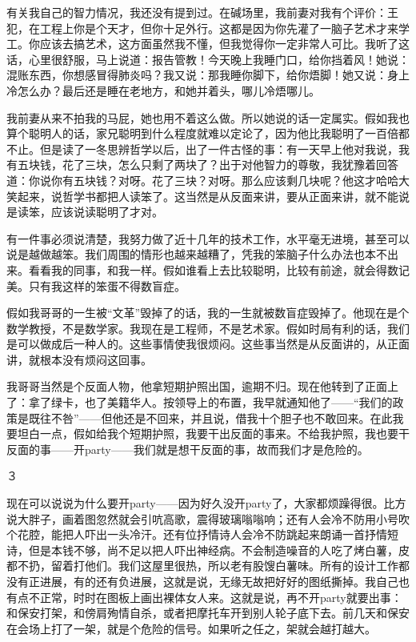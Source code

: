 有关我自己的智力情况，我还没有提到过。在碱场里，我前妻对我有个评价：王犯，在工程上你是个天才，但你十足外行。这都是因为你先灌了一脑子艺术才来学工。你应该去搞艺术，这方面虽然我不懂，但我觉得你一定非常人可比。我听了这话，心里很舒服，马上说道：报告管教！今天晚上我睡门口，给你挡着风！她说：混账东西，你想感冒得肺炎吗？我又说：那我睡你脚下，给你焐脚！她又说：身上冷怎么办？最后还是睡在老地方，和她并着头，哪儿冷焐哪儿。 

我前妻从来不拍我的马屁，她也用不着这么做。所以她说的话一定属实。假如我也算个聪明人的话，家兄聪明到什么程度就难以定论了，因为他比我聪明了一百倍都不止。但是读了一冬思辨哲学以后，出了一件古怪的事：有一天早上他对我说，我有五块钱，花了三块，怎么只剩了两块了？出于对他智力的尊敬，我犹豫着回答道：你说你有五块钱？对呀。花了三块？对呀。那么应该剩几块呢？他这才哈哈大笑起来，说哲学书都把人读笨了。这当然是从反面来讲，要从正面来讲，就不能说是读笨，应该说读聪明了才对。 



有一件事必须说清楚，我努力做了近十几年的技术工作，水平毫无进境，甚至可以说是越做越笨。我们周围的情形也越来越糟了，凭我的笨脑子什么办法也本不出来。看看我的同事，和我一样。假如谁看上去比较聪明，比较有前途，就会得数记美。只有我这样的笨蛋不得数盲症。 

假如我哥哥的一生被“文革”毁掉了的话，我的一生就被数盲症毁掉了。他现在是个数学教授，不是数学家。我现在是工程师，不是艺术家。假如时局有利的话，我们是可以做成后一种人的。这些事情使我很烦闷。这些事当然是从反面讲的，从正面讲，就根本没有烦闷这回事。 

我哥哥当然是个反面人物，他拿短期护照出国，逾期不归。现在他转到了正面上了：拿了绿卡，也了美籍华人。按领导上的布置，我早就通知他了——“我们的政策是既往不咎”——但他还是不回来，并且说，借我十个胆子也不敢回来。在此我要坦白一点，假如给我个短期护照，我要干出反面的事来。不给我护照，我也要干反面的事——开party——我们就是想干反面的事，故而我们才是危险的。 



３ 

现在可以说说为什么要开party——因为好久没开party了，大家都烦躁得很。比方说大胖子，画着图忽然就会引吭高歌，震得玻璃嗡嗡响；还有人会冷不防用小号吹个花腔，能把人吓出一头冷汗。还有位抒情诗人会冷不防跳起来朗诵一首抒情短诗，但是本钱不够，尚不足以把人吓出神经病。不会制造噪音的人吃了烤白薯，皮都不扔，留着打他们。我们这屋里很热，所以老有股馊白薯味。所有的设计工作都没有正进展，有的还有负进展，这就是说，无缘无故把好好的图纸撕掉。我自己也有点不正常，时时在图板上画出裸体女人来。这就是说，再不开party就要出事：和保安打架，和傍肩殉情自杀，或者把摩托车开到别人轮子底下去。前几天和保安在会场上打了一架，就是个危险的信号。如果听之任之，架就会越打越大。 

